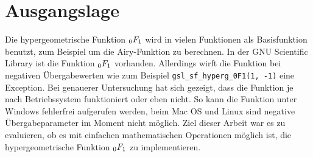 %
%
%
\section{Ausgangslage\label{0f1:section:ausgangslage}}
Die hypergeometrische Funktion $\mathstrut_0F_1$ wird in vielen Funktionen als Basisfunktion benutzt, 
%
%
zum Beispiel um die Airy-Funktion zu berechnen. 
%
In der GNU Scientific Library \cite{0f1:library-gsl} 
%
ist die Funktion $\mathstrut_0F_1$ vorhanden. 
Allerdings wirft die Funktion bei negativen Übergabewerten wie zum Beispiel \verb+gsl_sf_hyperg_0F1(1, -1)+ eine Exception. 
Bei genauerer Untersuchung hat sich gezeigt, dass die Funktion je nach Betriebssystem funktioniert oder eben nicht. 
So kann die Funktion unter Windows fehlerfrei aufgerufen werden, beim Mac OS und Linux sind negative Übergabeparameter im Moment nicht möglich.
%
%
%
Ziel dieser Arbeit war es zu evaluieren, ob es mit einfachen mathematischen Operationen möglich ist, die hypergeometrische Funktion $\mathstrut_0F_1$ zu implementieren.
